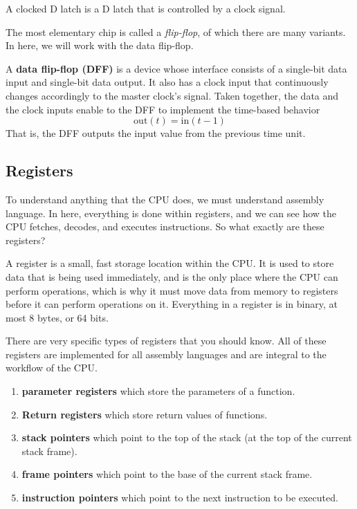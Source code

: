   A clocked D latch is a D latch that is controlled by a clock signal. 

  \begin{definition}
    
  \end{definition}

  The most elementary chip is called a \textit{flip-flop}, of which there are many variants. In here, we will work with the data flip-flop. 

  \begin{definition}
    A \textbf{data flip-flop (DFF)} is a device whose interface consists of a single-bit data input and single-bit data output. It also has a clock input that continuously changes accordingly to the master clock's signal. Taken together, the data and the clock inputs enable to the DFF to implement the time-based behavior 
    \begin{equation}
      \mathrm{out}(t) = \mathrm{in}(t - 1) 
    \end{equation}
    That is, the DFF outputs the input value from the previous time unit. 
  \end{definition}

\subsection{Registers}

  To understand anything that the CPU does, we must understand assembly language. In here, everything is done within registers, and we can see how the CPU fetches, decodes, and executes instructions. So what exactly are these registers? 

  \begin{definition}[Register]
    A register is a small, fast storage location within the CPU. It is used to store data that is being used immediately, and is the only place where the CPU can perform operations, which is why it must move data from memory to registers before it can perform operations on it. Everything in a register is in binary, at most 8 bytes, or 64 bits. 

    There are very specific types of registers that you should know. All of these registers are implemented for all assembly languages and are integral to the workflow of the CPU.  
    \begin{enumerate}
      \item \textbf{parameter registers} which store the parameters of a function.
      \item \textbf{Return registers} which store return values of functions. 
      \item \textbf{stack pointers} which point to the top of the stack (at the top of the current stack frame). 
      \item \textbf{frame pointers} which point to the base of the current stack frame.
      \item \textbf{instruction pointers} which point to the next instruction to be executed.
    \end{enumerate}
  \end{definition}

